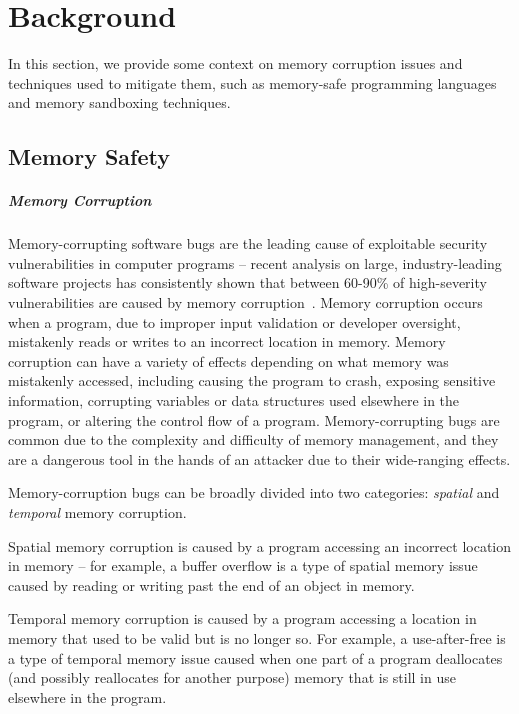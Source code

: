 \chapter{Background}

In this section, we provide some context on memory corruption issues and techniques used to mitigate
them, such as memory-safe programming languages and memory sandboxing techniques.

\section{Memory Safety}

\paragraph{Memory Corruption} Memory-corrupting software bugs are the leading cause of exploitable
security vulnerabilities in computer programs -- recent analysis on large, industry-leading software
projects has consistently shown that between 60-90\% of high-severity vulnerabilities are caused by
memory corruption~\cite{google:android-vulns, google:android-vulns-2, chromium:memory-safety,
msrc:memory-safety}. Memory corruption occurs when a program, due to improper input validation or
developer oversight, mistakenly reads or writes to an incorrect location in memory. Memory
corruption can have a variety of effects depending on what memory was mistakenly accessed, including
causing the program to crash, exposing sensitive information, corrupting variables or data
structures used elsewhere in the program, or altering the control flow of a program.
Memory-corrupting bugs are common due to the complexity and difficulty of memory management, and
they are a dangerous tool in the hands of an attacker due to their wide-ranging effects.

Memory-corruption bugs can be broadly divided into two categories: \textit{spatial} and
\textit{temporal} memory corruption.

\squishlist
    \item Spatial memory corruption is caused by a program accessing an incorrect location in memory
        -- for example, a buffer overflow is a type of spatial memory issue caused by reading or
        writing past the end of an object in memory.
    \item Temporal memory corruption is caused by a program accessing a location in memory that used
        to be valid but is no longer so. For example, a use-after-free is a type of temporal memory
        issue caused when one part of a program deallocates (and possibly reallocates for another
        purpose) memory that is still in use elsewhere in the program.
\squishend

